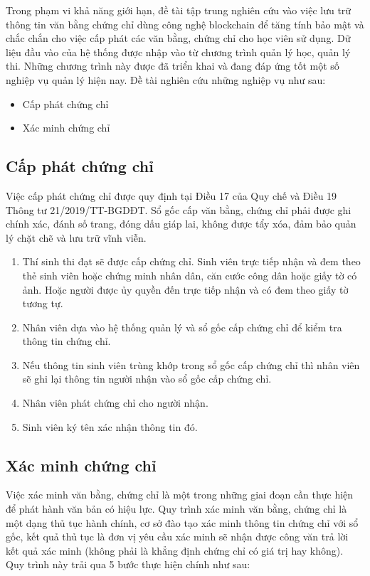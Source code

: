 Trong phạm vi khả năng giới hạn, đề tài tập trung nghiên cứu vào việc lưu trữ thông tin văn bằng chứng chỉ dùng công nghệ blockchain để tăng tính bảo mật và chắc chắn cho việc cấp phát các văn bằng, chứng chỉ cho học viên sử dụng. Dữ liệu đầu vào của hệ thống được nhập vào từ chương trình quản lý học, quản lý thi. Những chương trình này được đã triển khai và đang đáp ứng tốt một số nghiệp vụ quản lý hiện nay. Đề tài nghiên cứu những nghiệp vụ như sau:

\begin{itemize}
\item Cấp phát chứng chỉ
\item Xác minh chứng chỉ
\end{itemize}

\subsection{Cấp phát chứng chỉ}

Việc cấp phát chứng chỉ được quy định tại Điều 17 của Quy chế và Điều 19 Thông tư 21/2019/TT-BGDĐT. Sổ gốc cấp văn bằng, chứng chỉ phải được ghi chính xác, đánh số trang, đóng dấu giáp lai, không được tẩy xóa, đảm bảo quản lý chặt chẽ và lưu trữ vĩnh viễn.

\begin{enumerate}
\item Thí sinh thi đạt sẽ được cấp chứng chỉ. Sinh viên trực tiếp nhận và đem theo thẻ sinh viên hoặc chứng minh nhân dân, căn cước công dân hoặc giấy tờ có ảnh. Hoặc người được ủy quyền đến trực tiếp nhận và có đem theo giấy tờ tương tự.
\item Nhân viên dựa vào hệ thống quản lý và sổ gốc cấp chứng chỉ để kiểm tra thông tin chứng chỉ.
\item Nếu thông tin sinh viên trùng khớp trong sổ gốc cấp chứng chỉ thì nhân viên sẽ ghi lại thông tin người nhận vào sổ gốc cấp chứng chỉ.
\item Nhân viên phát chứng chỉ cho người nhận.
\item Sinh viên ký tên xác nhận thông tin đó.
\end{enumerate}

\subsection{Xác minh chứng chỉ}

Việc xác minh văn bằng, chứng chỉ là một trong những giai đoạn cần thực hiện để phát hành văn bản có hiệu lực. Quy trình xác minh văn bằng, chứng chỉ là một dạng thủ tục hành chính, cơ sở đào tạo xác minh thông tin chứng chỉ với sổ gốc, kết quả thủ tục là đơn vị yêu cầu xác minh sẽ nhận được công văn trả lời kết quả xác minh (không phải là khẳng định chứng chỉ có giá trị hay không). Quy trình này trải qua 5 bước thực hiện chính như sau:

